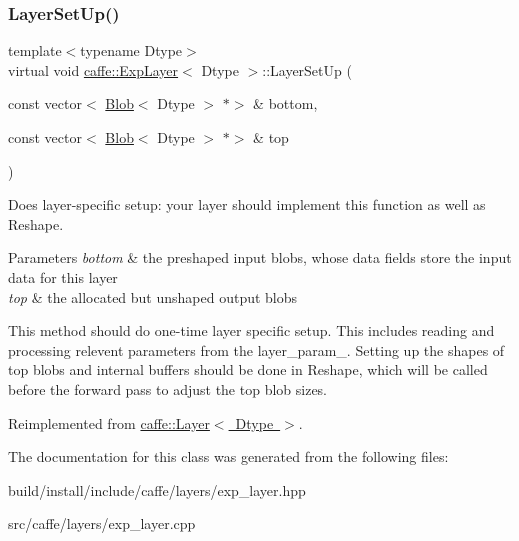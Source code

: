 \subsubsection{\texorpdfstring{Layer\+Set\+Up()}{LayerSetUp()}\hspace{0.1cm}{\footnotesize\ttfamily [2/2]}}
{\footnotesize\ttfamily template$<$typename Dtype$>$ \\
virtual void \mbox{\hyperlink{classcaffe_1_1_exp_layer}{caffe\+::\+Exp\+Layer}}$<$ Dtype $>$\+::Layer\+Set\+Up (\begin{DoxyParamCaption}\item[{const vector$<$ \mbox{\hyperlink{classcaffe_1_1_blob}{Blob}}$<$ Dtype $>$ $\ast$$>$ \&}]{bottom,  }\item[{const vector$<$ \mbox{\hyperlink{classcaffe_1_1_blob}{Blob}}$<$ Dtype $>$ $\ast$$>$ \&}]{top }\end{DoxyParamCaption})\hspace{0.3cm}{\ttfamily [virtual]}}



Does layer-\/specific setup\+: your layer should implement this function as well as Reshape. 


\begin{DoxyParams}{Parameters}
{\em bottom} & the preshaped input blobs, whose data fields store the input data for this layer \\
\hline
{\em top} & the allocated but unshaped output blobs\\
\hline
\end{DoxyParams}
This method should do one-\/time layer specific setup. This includes reading and processing relevent parameters from the {\ttfamily layer\+\_\+param\+\_\+}. Setting up the shapes of top blobs and internal buffers should be done in {\ttfamily Reshape}, which will be called before the forward pass to adjust the top blob sizes. 

Reimplemented from \mbox{\hyperlink{classcaffe_1_1_layer_a481323a3e0972c682787f2137468c29f}{caffe\+::\+Layer$<$ Dtype $>$}}.



The documentation for this class was generated from the following files\+:\begin{DoxyCompactItemize}
\item 
build/install/include/caffe/layers/exp\+\_\+layer.\+hpp\item 
src/caffe/layers/exp\+\_\+layer.\+cpp\end{DoxyCompactItemize}
